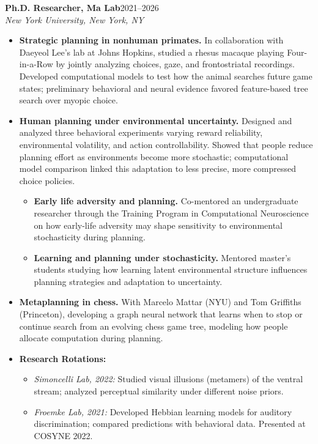 \documentclass[10pt]{article}
\newcommand{\cvrole}[3]{%
  \textbf{#1}\hfill #3\\[-0.15em]
  \textit{#2}\par
}
\begin{document}
\cvrole{Ph.D. Researcher, Ma Lab}{New York University, New York, NY}{2021--2026}
\begin{itemize}
    \item \textbf{Strategic planning in nonhuman primates.} In collaboration with Daeyeol Lee’s lab at Johns Hopkins, studied a rhesus macaque playing Four-in-a-Row by jointly analyzing choices, gaze, and frontostriatal recordings. Developed computational models to test how the animal searches future game states; preliminary behavioral and neural evidence favored feature-based tree search over myopic choice.

    \item \textbf{Human planning under environmental uncertainty.} Designed and analyzed three behavioral experiments varying reward reliability, environmental volatility, and action controllability. Showed that people reduce planning effort as environments become more stochastic; computational model comparison linked this adaptation to less precise, more compressed choice policies.
    \begin{itemize}
        \item \textbf{Early life adversity and planning.} Co-mentored an undergraduate researcher through the Training Program in Computational Neuroscience on how early-life adversity may shape sensitivity to environmental stochasticity during planning.
        \item \textbf{Learning and planning under stochasticity.} Mentored master’s students studying how learning latent environmental structure influences planning strategies and adaptation to uncertainty.
    \end{itemize}

    \item \textbf{Metaplanning in chess.} With Marcelo Mattar (NYU) and Tom Griffiths (Princeton), developing a graph neural network that learns when to stop or continue search from an evolving chess game tree, modeling how people allocate computation during planning.

    \item \textbf{Research Rotations:}
    \begin{itemize}
        \item \textit{Simoncelli Lab, 2022:} Studied visual illusions (metamers) of the ventral stream; analyzed perceptual similarity under different noise priors.
        \item \textit{Froemke Lab, 2021:} Developed Hebbian learning models for auditory discrimination; compared predictions with behavioral data. Presented at COSYNE 2022.
    \end{itemize}
\end{itemize}
\end{document}
